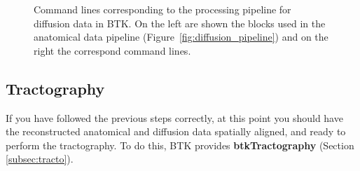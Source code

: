   \begin{figure*}[!h]
   \caption{Command lines corresponding to the processing pipeline for diffusion data in BTK. On the left are shown the blocks used in the anatomical data pipeline (Figure~\ref{fig:diffusion_pipeline}) and on the right the correspond command lines.}
   \label{fig:diffusion_command_line}
 \end{figure*}

\subsection{Tractography}
If you have followed the previous steps correctly, at this point you should
have the reconstructed anatomical and diffusion data spatially aligned, and
ready to perform the tractography. To do this, BTK provides
\textbf{btkTractography} (Section \ref{subsec:tracto}).
